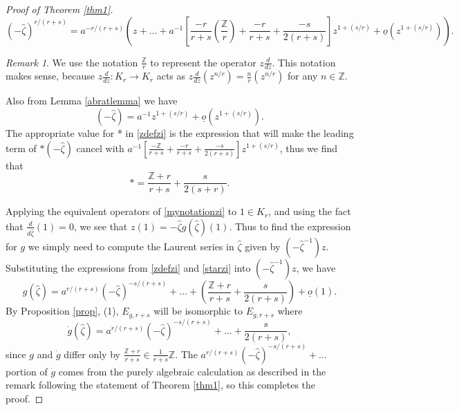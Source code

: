 \documentclass[11pt]{amsart}
\theoremstyle{theorem}
\theoremstyle{lemma}
\theoremstyle{corollary}
\theoremstyle{proposition}
\theoremstyle{definition}
\theoremstyle{remark}
\newtheorem*{remark}{Remark}
\def\z{\hat{\zeta}}
\begin{document}
\begin{proof}[Proof of Theorem \ref{thm1}]
\begin{equation*}
    (-\z)^{r/(r+s)}=a^{-r/(r+s)}\left(z+\dots+a^{-1}\left[\frac{-r}{r+s}\left(\frac{\mathbb{Z}}{r}\right)+\frac{-r}{r+s} + \frac{-s}{2(r+s)}\right]z^{1+(s/r)}+\underline{o}(z^{1+(s/r)})\right).
\end{equation*}
\begin{remark}  We use the notation $\frac{\mathbb{Z}}{r}$ to represent the operator $z\frac{d}{dz}$.  This notation makes sense, because $z\frac{d}{dz}:K_r\to K_r$ acts as $z\frac{d}{dz}(z^{n/r})=\frac{n}{r}(z^{n/r})$ for any $n\in\mathbb{Z}$.
\end{remark}

Also from Lemma \ref{abratlemma} we have
\begin{equation*}
    (-\z)=a^{-1}z^{1+(s/r)}+\underline{o}(z^{1+(s/r)}).
\end{equation*}
The appropriate value for * in \eqref{zdefzi} is the expression that will make the leading term of $*(-\z)$ cancel with $a^{-1}\left[\frac{-\mathbb{Z}}{r+s}+\frac{-r}{r+s} + \frac{-s}{2(r+s)}\right]z^{1+(s/r)}$, thus we find that
\begin{equation}\label{starzi}
    *=\frac{\mathbb{Z}+r}{r+s}+\frac{s}{2(s+r)}.
\end{equation}

Applying the equivalent operators of \eqref{mynotationzi} to $1\in K_r$, and using the fact that $\frac{d}{d\z }(1)=0$, we see that $z(1)=-\z g(\z)(1)$.
 Thus to find the expression for $g$ we simply need to compute the Laurent series in $\z$ given by $(-\z^{-1})z$.  Substituting the expressions from \eqref{zdefzi} and \eqref{starzi} into $(-\z^{-1})z$, we have
\begin{equation*}
    g(\z)=a^{r/(r+s)}(-\z)^{-s/(r+s)}+\dots + \left(\frac{\mathbb{Z}+r}{r+s} +\frac{s}{2(r+s)}\right)+\underline{o}(1).
\end{equation*}  By Proposition \ref{prop}, (1), $E_{g,r+s}$ will be isomorphic to $E_{\dot{g},r+s}$ where
$$\dot{g}(\z)=a^{r/(r+s)}(-\z)^{-s/(r+s)}+\dots + \frac{s}{2(r+s)},$$
since $g$ and $\dot{g}$ differ only by $\frac{\mathbb{Z}+r}{r+s}\in \frac{1}{r+s}\mathbb{Z}$.  The $a^{r/(r+s)}(-\z)^{-s/(r+s)}+\dots$ portion of $\dot{g}$ comes from the purely algebraic calculation as described in the remark following the statement of Theorem \ref{thm1}, so this completes the proof.
  \end{proof}
\end{document}
